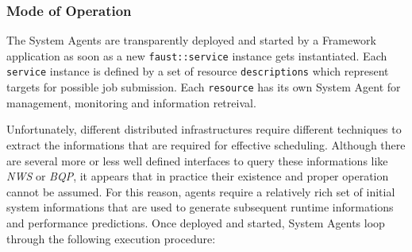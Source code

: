 \subsubsection{Mode of Operation}

The System Agents are transparently deployed and started by a \FAUST Framework application as soon as a new \texttt{faust::service} instance gets instantiated. Each \texttt{service} instance is defined by a set of resource \texttt{descriptions} which represent targets for possible job submission. Each \texttt{resource} has its own System Agent for management, monitoring and information retreival. 

Unfortunately, different distributed infrastructures require different techniques to extract the informations that are required for effective scheduling. Although there are several more or less well defined interfaces to query these informations like \textit{NWS} or \textit{BQP}, it appears that in practice their existence and proper operation cannot be assumed. For this reason, agents require a relatively rich set of initial system informations that are used to generate subsequent runtime informations and performance predictions. Once deployed and started, System Agents loop through the following execution procedure: 



